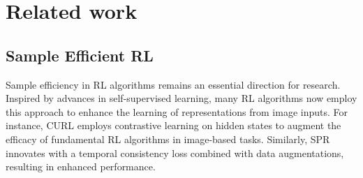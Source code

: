 \section{Related work}

\subsection{Sample Efficient RL}

Sample efficiency in RL algorithms remains an essential direction for research. Inspired by advances in self-supervised learning, many RL algorithms now employ this approach to enhance the learning of representations from image inputs. 
For instance, CURL \citep{laskin2020curl} employs contrastive learning on hidden states to augment the efficacy of fundamental RL algorithms in image-based tasks. Similarly, SPR \citep{schwarzer2020data} innovates with a temporal consistency loss combined with data augmentations, resulting in enhanced performance.

